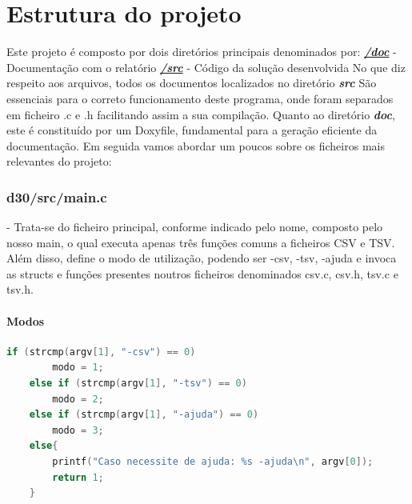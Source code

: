 \documentclass[a4wide]{report}
\begin{document}
\chapter{Estrutura do projeto}
Este projeto é composto por dois diretórios principais denominados por: 
\textit{\textbf{\href{https://github.com/LabInf24/d-30-1/tree/main/doc}{/doc}}} - Documentação com o relatório
\textbf{\textit{\href{https://github.com/LabInf24/d-30-1/tree/main/src}{/src}}} - Código da solução desenvolvida
No que diz respeito aos arquivos, todos os documentos localizados no diretório \textit{\textbf{src}} São essenciais para o correto funcionamento deste programa, onde foram separados em ficheiro .c e .h facilitando assim a sua compilação. Quanto ao diretório \textit{\textbf{doc}}, este é constituído por um Doxyfile, fundamental para a geração eficiente da documentação. 
Em seguida vamos abordar um poucos sobre os ficheiros mais relevantes do projeto: 
\subsection{d30/src/main.c} - Trata-se do ficheiro principal, conforme indicado pelo nome, composto pelo nosso main, o qual executa apenas três funções comuns a ficheiros CSV e TSV. Além disso, define o modo de utilização, podendo ser -csv, -tsv, -ajuda e invoca as structs e funções presentes noutros ficheiros denominados csv.c, csv.h, tsv.c e tsv.h.
\subsubsection{Modos}
\begin{lstlisting}[xleftmargin=1em, xrightmargin=1em,language=C, caption={Modo}, label={codigo:c}]
        if (strcmp(argv[1], "-csv") == 0)
        modo = 1;
    else if (strcmp(argv[1], "-tsv") == 0)
        modo = 2;
    else if (strcmp(argv[1], "-ajuda") == 0)
        modo = 3;
    else{
        printf("Caso necessite de ajuda: %s -ajuda\n", argv[0]);
        return 1;
    }\end{lstlisting}
\end{document}
